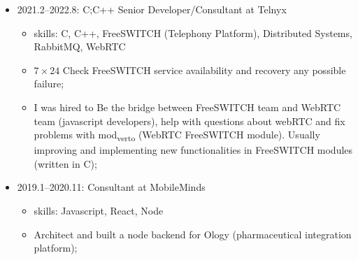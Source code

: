 \documentclass[
]{article}
\providecommand{\tightlist}{%
  \setlength{\itemsep}{0pt}\setlength{\parskip}{0pt}}
\begin{document}
\vspace{2mm}

\begin{itemize}
\tightlist
\item
  2021.2--2022.8: C;C++ Senior Developer/Consultant at Telnyx

  \begin{itemize}
  \tightlist
  \item
    skills: C, C++, FreeSWITCH (Telephony Platform), Distributed
    Systems, RabbitMQ, WebRTC
  \item
    \(7 \times 24\) Check FreeSWITCH service availability and recovery
    any possible failure;
  \item
    I was hired to Be the bridge between FreeSWITCH team and WebRTC team
    (javascript developers), help with questions about webRTC and fix
    problems with mod\textsubscript{verto} (WebRTC FreeSWITCH module).
    Usually improving and implementing new functionalities in FreeSWITCH
    modules (written in C);
  \end{itemize}
\end{itemize}

\vspace{2mm}

\begin{itemize}
\tightlist
\item
  2019.1--2020.11: Consultant at MobileMinds

  \begin{itemize}
  \tightlist
  \item
    skills: Javascript, React, Node
  \item
    Architect and built a node backend for Ology (pharmaceutical
    integration platform);
  \end{itemize}
\end{itemize}

\vspace{2mm}
\end{document}
